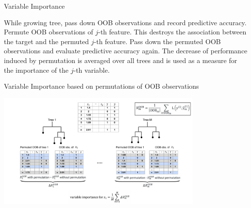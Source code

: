 \documentclass[11pt,compress,t,notes=noshow, xcolor=table]{beamer}
\begin{document}
\begin{vbframe}{Variable Importance}
\framebreak

\begin{algorithm}[H]
  \small
  \caption*{Measure based on permutations of OOB observations}
  \begin{algorithmic}[0]
    \State While growing tree, pass down OOB observations and record predictive accuracy.
    \State Permute OOB observations of $j$-th feature. This destroys the association between the target and the permuted $j$-th feature.
    \State Pass down the permuted OOB observations and evaluate predictive accuracy again.
    \State The decrease of performance induced by permutation is averaged over all trees and
  is used as a measure for the importance of the $j$-th variable.
  \end{algorithmic}
\end{algorithm}








\end{vbframe}

\begin{vbframe}{Variable Importance based on permutations of OOB observations}
\begin{center}
\includegraphics[width = 10.3cm]{figure_man/rF_varImp_permutation_new.pdf}
\end{center}
\end{vbframe}

\endlecture
\end{document}
